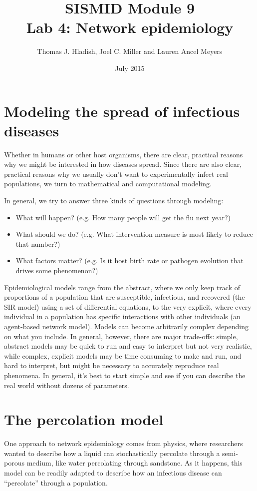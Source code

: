 \documentclass{article}
\begin{document}
\title{SISMID Module 9\\Lab 4: Network epidemiology}
\author{Thomas J. Hladish, Joel C. Miller and Lauren Ancel Meyers}
\date{July 2015}
\maketitle


\section*{Modeling the spread of infectious diseases}
Whether in humans or other host organisms, there are clear, practical reasons
why we might be interested in how diseases spread.  Since there are also clear,
practical reasons why we usually don't want to experimentally infect real
populations, we turn to mathematical and computational modeling.

In general, we try to answer three kinds of questions through modeling:
\begin{itemize}
 \item What will happen? (e.g. How many people will get the flu next year?)
 \item What should we do? (e.g. What intervention measure is most likely to
reduce that number?)
 \item What factors matter? (e.g. Is it host birth rate or pathogen evolution
that drives some phenomenon?)
\end{itemize}

Epidemiological models range from the abstract, where we only keep track of
proportions of a population that are susceptible, infectious, and recovered (the
SIR model) using a set of differential equations, to the very explicit, where
every individual in a population has specific interactions with other
individuals (an agent-based network model).  Models can become arbitrarily
complex depending on what you include.  In general, however, there are major
trade-offs: simple, abstract models may be quick to run and easy to interpret but
not very realistic, while complex, explicit models may be time consuming to make
and run, and hard to interpret, but might be necessary to accurately reproduce
real phenomena.  In general, it's best to start simple and see if you can
describe the real world without dozens of parameters.

\section*{The percolation model}
\label{perc}
One approach to network epidemiology comes from physics, where researchers
wanted to describe how a liquid can stochastically percolate through a
semi-porous medium, like water percolating through sandstone.  As it happens,
this model can be readily adapted to describe how an infectious disease can
``percolate'' through a population.
\end{document}

